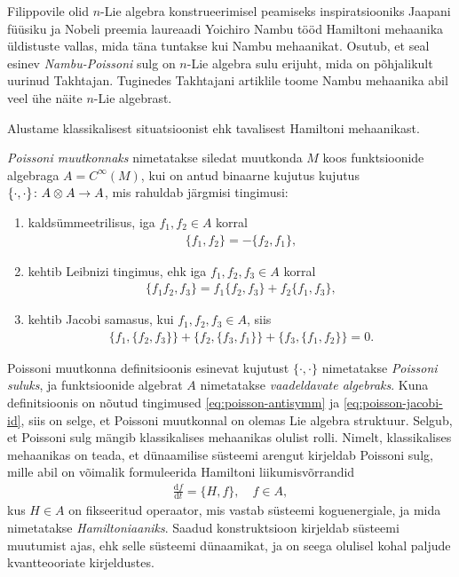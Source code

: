 Filippovile olid $n$-Lie algebra konstrueerimisel peamiseks
inspiratsiooniks Jaapani füüsiku ja Nobeli preemia laureaadi
Yoichiro Nambu tööd Hamiltoni mehaanika
üldistuste vallas, mida täna tuntakse kui Nambu mehaanikat. Osutub, et
seal esinev \emph{Nambu-Poissoni} sulg on $n$-Lie algebra sulu erijuht,
mida on põhjalikult uurinud Takhtajan.\cite{takhtajan1994}
Tuginedes Takhtajani artiklile toome Nambu mehaanika abil veel ühe
näite $n$-Lie algebrast.

Alustame klassikalisest situatsioonist ehk tavalisest Hamiltoni mehaanikast.

\begin{dfn}
    \emph{Poissoni muutkonnaks} nimetatakse siledat muutkonda $M$ koos
    funktsioonide algebraga $A = C^\infty(M)$, kui on antud binaarne kujutus
    kujutus $\{\cdot, \cdot\} \colon A \otimes A \to A$, mis rahuldab
    järgmisi tingimusi:
    \begin{enumerate}
      \item kaldsümmeetrilisus, iga $f_1, f_2 \in A$ korral
          \begin{align}\label{eq:poisson-antisymm}
              \{f_1, f_2\} = -\{f_2, f_1\},
          \end{align}
      \item kehtib Leibnizi tingimus, ehk iga $f_1, f_2, f_3 \in A$ korral
          \begin{align}
              \{f_1 f_2, f_3\} = f_1 \{f_2, f_3\} + f_2 \{f_1, f_3\},
          \end{align}
      \item kehtib Jacobi samasus, kui $f_1, f_2, f_3 \in A$, siis
          \begin{align}\label{eq:poisson-jacobi-id}
              \{f_1, \{f_2, f_3\}\} + \{f_2, \{f_3, f_1\}\} +
              \{f_3, \{f_1, f_2\}\} = 0.
          \end{align}
    \end{enumerate}
\end{dfn}

Poissoni muutkonna definitsioonis esinevat kujutust $\{\cdot, \cdot\}$
nimetatakse \emph{Poissoni suluks}, ja funktsioonide algebrat $A$ nimetatakse
\emph{vaadeldavate algebraks}. Kuna definitsioonis on nõutud tingimused
\eqref{eq:poisson-antisymm} ja \eqref{eq:poisson-jacobi-id}, siis on selge,
et Poissoni muutkonnal on olemas Lie algebra struktuur.
Selgub, et Poissoni sulg mängib klassikalises mehaanikas olulist rolli.
Nimelt, klassikalises mehaanikas on teada, et dünaamilise süsteemi arengut
kirjeldab Poissoni sulg, mille abil on võimalik formuleerida Hamiltoni
liikumisvõrrandid
\begin{align}\label{eq:hamilton-equation}
    \frac{\mathrm{d} f}{\mathrm{d} t} = \{H, f\}, \quad f \in A,
\end{align}
kus $H \in A$ on fikseeritud operaator, mis vastab süsteemi koguenergiale,
ja mida nimetatakse \emph{Hamiltoniaaniks}. Saadud konstruktsioon
kirjeldab süsteemi muutumist ajas, ehk selle süsteemi dünaamikat, ja on
seega olulisel kohal paljude kvantteooriate kirjeldustes.

